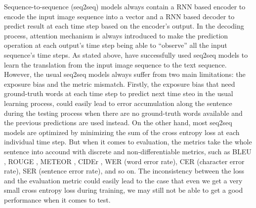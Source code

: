 \documentclass[a4paper, 10pt, conference]{ieeeconf}      %
\begin{document}
	Sequence-to-sequence (seq2seq) models always contain a RNN based encoder to encode the input image sequence into a vector and a RNN based decoder to predict result at each time step based on the encoder's output. In the decoding process, attention mechanism is always introduced to make the prediction operation at each output's time step being able to ``observe'' all the input sequence's time steps. As stated above, \cite{Chung, Chung2017, Afouras2018} have successfully used seq2seq models to learn the translation from the input image sequence to the text sequence. 
	However, the usual seq2seq models always suffer from two main limitations: the exposure bias and the metric mismatch. Firstly, the exposure bias that need ground-truth words at each time step to predict next time steo in the usual learning process, could easily lead to error accumulation along the sentence during the testing process when there are no ground-truth words available and the previous predictions are used instead.
	On the other hand, most seq2seq models are optimized by minimizing the sum of the cross entropy loss at each individual time step. But when it comes to evaluation, the metrics take the whole sentence into accound with discrete and non-differentiable metrics, such as BLEU \cite{Papineni2002}, ROUGE \cite{Lin2001}, METEOR \cite{Banerjee2003}, CIDEr \cite{Tech}, WER (word error rate), CER (character error rate), SER (sentence error rate), and so on. The inconsistency between the loss and the evaluation metric could easily lead to the case that even we get a very small cross entropy loss during training, we may still not be able to get a good performance when it comes to test. %
	
\end{document}
